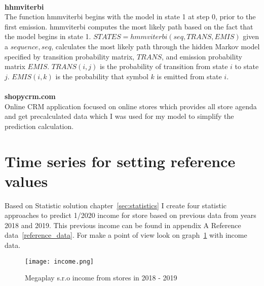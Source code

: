 \\
\textbf{hhmviterbi}~\cite{hhmviterbi}\\
The function hmmviterbi begins with the model in state 1 at step 0, prior to the first emission.
hmmviterbi computes the most likely path based on the fact that the model begins in state 1.
$STATES = hmmviterbi(seq,TRANS,EMIS)$ given a $sequence, seq$, calculates the most likely path through the hidden Markov model
specified by transition probability matrix, $TRANS$, and emission probability matrix $EMIS$. $TRANS(i,j)$ is the probability of transition from state $i$ to state $j$.
$EMIS(i,k)$ is the probability that symbol $k$ is emitted from state $i$.\\
\\
\textbf{shopycrm.com}\\
Online CRM application focused on online stores which provides all store agenda and get precalculated data which I was used for my model to simplify the prediction calculation.
\newpage
\section{Time series for setting reference values} \label{sec:timeseries}
Based on Statistic solution chapter~\ref{sec:statistics} I create four statistic approaches to predict 1/2020 income for store based on previous data from years 2018 and 2019.
This previous income can be found in appendix A Reference data~\ref{reference_data}.
For make a point of view look on graph~\ref{income} with income data.\\
\begin{figure}[h!]
    \begin{center}
        \texttt{[image: income.png]}
    \end{center}
    \caption{Megaplay s.r.o income from stores in 2018 - 2019}
    \label{income}
\end{figure}
